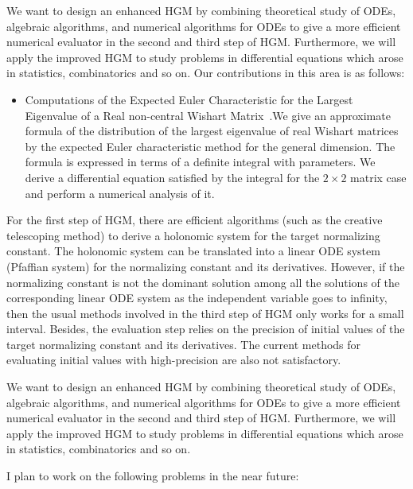 \documentclass[10pt,a4paper]{article}
\begin{document}
  We want to design an enhanced HGM by combining theoretical study of ODEs, algebraic algorithms, and numerical algorithms for ODEs to give a more efficient numerical evaluator in the second and third step of HGM. Furthermore, we will apply the improved HGM to study problems in differential equations which arose in statistics, combinatorics and so on.  Our contributions in this area is as follows: 

\begin{itemize}
\item Computations of the Expected Euler Characteristic for the Largest Eigenvalue of a Real non-central Wishart Matrix~\cite{Takayama2019}.We give an approximate formula of the distribution of the largest
eigenvalue of real Wishart matrices by the expected Euler characteristic
method for the general dimension.
The formula is expressed in terms of a definite integral with parameters.
We derive a differential equation satisfied by the integral
for the $2 \times 2$ matrix case and perform a numerical analysis of it.
\end{itemize}

For the first step of HGM, there are efficient algorithms (such as the creative telescoping method) to derive a holonomic system for the target normalizing constant. The holonomic system can be translated into a linear ODE system (Pfaffian system) for the normalizing constant and its derivatives. However, if the normalizing constant is not the dominant solution among all the solutions of the corresponding linear ODE system as the independent variable goes to infinity, then the usual methods involved in the third step of HGM only works for a small interval. Besides, the evaluation step relies on the precision of initial values of the target normalizing constant and its derivatives. The current methods for evaluating initial values with high-precision are also not satisfactory. 
 
  We want to design an enhanced HGM by combining theoretical study of ODEs, algebraic algorithms, and numerical algorithms for ODEs to give a more efficient numerical evaluator in the second and third step of HGM. Furthermore, we will apply the improved HGM to study problems in differential equations which arose in statistics, combinatorics and so on.  

I plan to work on the following problems in the near future:
\end{document}
